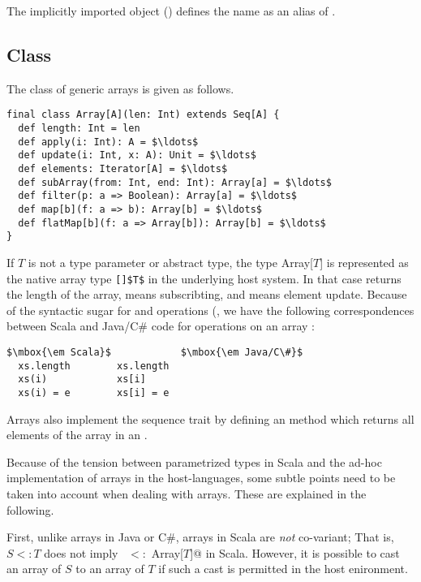 {The implicitly imported  object () defines the name 
 as an alias of .

\subsection{Class \large{}}\label{cls:array}

The class of generic arrays is given as follows.

\begin{lstlisting}
final class Array[A](len: Int) extends Seq[A] {
  def length: Int = len
  def apply(i: Int): A = $\ldots$
  def update(i: Int, x: A): Unit = $\ldots$
  def elements: Iterator[A] = $\ldots$
  def subArray(from: Int, end: Int): Array[a] = $\ldots$
  def filter(p: a => Boolean): Array[a] = $\ldots$
  def map[b](f: a => b): Array[b] = $\ldots$
  def flatMap[b](f: a => Array[b]): Array[b] = $\ldots$
}
\end{lstlisting}
If $T$ is not a type parameter or abstract type, the type Array[$T$]
is represented as the native array type \lstinline{[]$T$} in the
underlying host system. In that case  returns
the length of the array,  means subscribting, and
 means element update. Because of the syntactic sugar for
 and
 operations (,
we have the following correspondences between Scala and Java/C\# code for
operations on an array :

\begin{lstlisting}
$\mbox{\em Scala}$            $\mbox{\em Java/C\#}$
  xs.length        xs.length
  xs(i)            xs[i]
  xs(i) = e        xs[i] = e
\end{lstlisting}

Arrays also implement the sequence trait 
by defining an  method which returns
all elements of the array in an .

Because of the tension between parametrized types in Scala and the ad-hoc
implementation of arrays in the host-languages, some subtle points
need to be taken into account when dealing with arrays. These are
explained in the following.

First, unlike arrays in Java or C\#, arrays in Scala are {\em not}
co-variant; That is, $S <: T$ does not imply 
~\lstinline@Array[$S$] $<:$ Array[$T$]@ in Scala.  
However, it is possible to cast an array
of $S$ to an array of $T$ if such a cast is permitted in the host
enironment.

}
